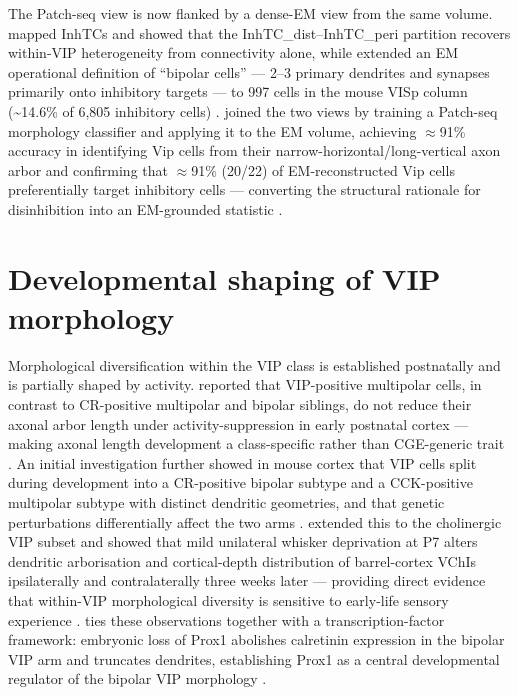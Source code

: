 \documentclass[11pt]{article}
\begin{document}
The Patch-seq view is now flanked by a dense-EM view from the same volume. \citet{Schneidermizell2025} mapped InhTCs and showed that the InhTC\_dist--InhTC\_peri partition recovers within-VIP heterogeneity from connectivity alone, while \citet{Elabbady2025} extended an EM operational definition of ``bipolar cells'' --- 2--3 primary dendrites and synapses primarily onto inhibitory targets --- to 997 cells in the mouse VISp column ({\textasciitilde}14.6\% of 6,805 inhibitory cells) \citep{Schneidermizell2025, Elabbady2025, Gouwens2020a, Gamlin2025}. \citet{Gamlin2025} joined the two views by training a Patch-seq morphology classifier and applying it to the EM volume, achieving $\approx$91\% accuracy in identifying Vip cells from their narrow-horizontal/long-vertical axon arbor and confirming that $\approx$91\% (20/22) of EM-reconstructed Vip cells preferentially target inhibitory cells --- converting the structural rationale for disinhibition into an EM-grounded statistic \citep{Gamlin2025, Schneidermizell2025, Elabbady2025, Lee2013}.

\section{Developmental shaping of VIP morphology}

Morphological diversification within the VIP class is established postnatally and is partially shaped by activity. \citet{Demarcogarcia2011} reported that VIP-positive multipolar cells, in contrast to CR-positive multipolar and bipolar siblings, do not reduce their axonal arbor length under activity-suppression in early postnatal cortex --- making axonal length development a class-specific rather than CGE-generic trait \citep{Demarcogarcia2011, Stachniak2021, Wong2022, Fishell2020}. An initial investigation further showed in mouse cortex that VIP cells split during development into a CR-positive bipolar subtype and a CCK-positive multipolar subtype with distinct dendritic geometries, and that genetic perturbations differentially affect the two arms \citep{Demarcogarcia2011, Yayon2023}. \citet{Yayon2023} extended this to the cholinergic VIP subset and showed that mild unilateral whisker deprivation at P7 alters dendritic arborisation and cortical-depth distribution of barrel-cortex VChIs ipsilaterally and contralaterally three weeks later --- providing direct evidence that within-VIP morphological diversity is sensitive to early-life sensory experience \citep{Yayon2023, Demarcogarcia2011, Stachniak2021, Pronneke2015}. \citet{Fishell2020} ties these observations together with a transcription-factor framework: embryonic loss of Prox1 abolishes calretinin expression in the bipolar VIP arm and truncates dendrites, establishing Prox1 as a central developmental regulator of the bipolar VIP morphology \citep{Fishell2020, Stachniak2021, Demarcogarcia2011, Wong2022}.
\end{document}
